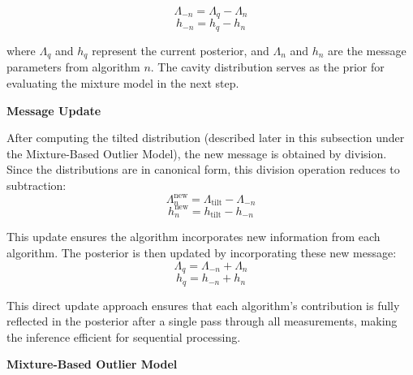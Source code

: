 \documentclass[12pt,a4paper]{article}
\begin{document}
\begin{equation}
\Lambda_{-n} = \Lambda_q - \Lambda_n
\end{equation}
\begin{equation}
h_{-n} = h_q - h_n
\end{equation}

where $\Lambda_q$ and $h_q$ represent the current posterior, and $\Lambda_n$ and $h_n$ are the message parameters from algorithm $n$. The cavity distribution serves as the prior for evaluating the mixture model in the next step.

\textbf{Message Update}

After computing the tilted distribution (described later in this subsection under the Mixture-Based Outlier Model), the new message is obtained by division. Since the distributions are in canonical form, this division operation reduces to subtraction:
\begin{equation}
\Lambda_n^{\text{new}} = \Lambda_{\text{tilt}} - \Lambda_{-n} 
\end{equation}
\begin{equation}
h_n^{\text{new}} = h_{\text{tilt}} - h_{-n}
\end{equation}

This update ensures the algorithm incorporates new information from each algorithm. The posterior is then updated by incorporating these new message:
\begin{equation}
\Lambda_q = \Lambda_{-n} + \Lambda_n 
\end{equation}
\begin{equation}
h_q = h_{-n} + h_n
\end{equation}

This direct update approach ensures that each algorithm's contribution is fully reflected in the posterior after a single pass through all measurements, making the inference efficient for sequential processing.

\textbf{Mixture-Based Outlier Model}
\end{document}
